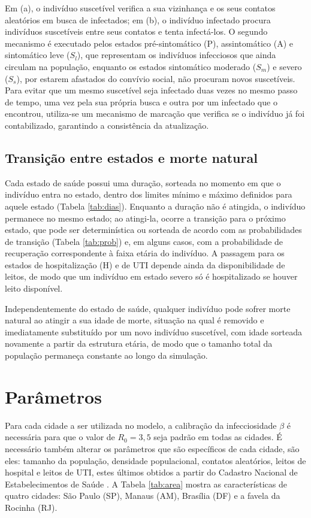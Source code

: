 Em (a), o indivíduo suscetível verifica a sua vizinhança e os seus contatos aleatórios em busca de infectados; em (b), o indivíduo infectado procura indivíduos suscetíveis entre seus contatos e tenta infectá-los. O segundo mecanismo é executado pelos estados pré-sintomático (P), assintomático (A) e sintomático leve ($S_l$), que representam os indivíduos infecciosos que ainda circulam na população, enquanto os estados sintomático moderado ($S_m$) e severo ($S_s$), por estarem afastados do convívio social, não procuram novos suscetíveis. Para evitar que um mesmo suscetível seja infectado duas vezes no mesmo passo de tempo, uma vez pela sua própria busca e outra por um infectado que o encontrou, utiliza-se um mecanismo de marcação que verifica se o indivíduo já foi contabilizado, garantindo a consistência da atualização.

\subsection{Transição entre estados e morte natural}

Cada estado de saúde possui uma duração, sorteada no momento em que o indivíduo entra no estado, dentro dos limites mínimo e máximo definidos para aquele estado (Tabela \ref{tab:dias}). Enquanto a duração não é atingida, o indivíduo permanece no mesmo estado; ao atingi-la, ocorre a transição para o próximo estado, que pode ser determinística ou sorteada de acordo com as probabilidades de transição (Tabela \ref{tab:prob}) e, em alguns casos, com a probabilidade de recuperação correspondente à faixa etária do indivíduo. A passagem para os estados de hospitalização (H) e de UTI depende ainda da disponibilidade de leitos, de modo que um indivíduo em estado severo só é hospitalizado se houver leito disponível.

Independentemente do estado de saúde, qualquer indivíduo pode sofrer morte natural ao atingir a sua idade de morte, situação na qual é removido e imediatamente substituído por um novo indivíduo suscetível, com idade sorteada novamente a partir da estrutura etária, de modo que o tamanho total da população permaneça constante ao longo da simulação.

\section{Parâmetros}

Para cada cidade a ser utilizada no modelo, a calibração da infecciosidade $\beta$ é necessária para que o valor de $R_0 = 3{,}5$ seja padrão em todas as cidades. É necessário também alterar os parâmetros que são específicos de cada cidade, são eles: tamanho da população, densidade populacional, contatos aleatórios, leitos de hospital e leitos de UTI, estes últimos obtidos a partir do Cadastro Nacional de Estabelecimentos de Saúde \cite{datasus}. A Tabela \ref{tab:area} mostra as características de quatro cidades: São Paulo (SP), Manaus (AM), Brasília (DF) e a favela da Rocinha (RJ).

